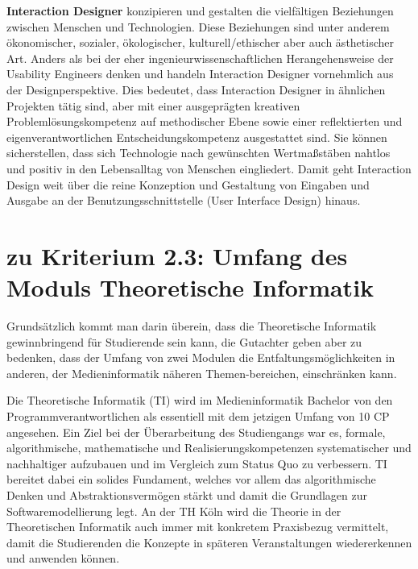 \textbf{Interaction Designer} konzipieren und gestalten die vielfältigen
Beziehungen zwischen Menschen und Technologien. Diese Beziehungen sind
unter anderem ökonomischer, sozialer, ökologischer, kulturell/ethischer
aber auch ästhetischer Art. Anders als bei der eher
ingenieurwissenschaftlichen Herangehensweise der Usability Engineers
denken und handeln Interaction Designer vornehmlich aus der
Designperspektive. Dies bedeutet, dass Interaction Designer in ähnlichen
Projekten tätig sind, aber mit einer ausgeprägten kreativen
Problemlösungskompetenz auf methodischer Ebene sowie einer reflektierten
und eigenverantwortlichen Entscheidungskompetenz ausgestattet sind. Sie
können sicherstellen, dass sich Technologie nach gewünschten
Wertmaßstäben nahtlos und positiv in den Lebensalltag von Menschen
eingliedert. Damit geht Interaction Design weit über die reine
Konzeption und Gestaltung von Eingaben und Ausgabe an der
Benutzungsschnittstelle (User Interface Design) hinaus.

\section{zu Kriterium 2.3: Umfang des Moduls Theoretische
Informatik}\label{zu-kriterium-2.3-umfang-des-moduls-theoretische-informatik}

\begin{siderules}
Grundsätzlich kommt man darin überein, dass die Theoretische Informatik
gewinnbringend für Studierende sein kann, die Gutachter geben aber zu
bedenken, dass der Umfang von zwei Modulen die Entfaltungsmöglichkeiten
in anderen, der Medieninformatik näheren Themen-bereichen, einschränken
kann.
\end{siderules}

Die Theoretische Informatik (TI) wird im Medieninformatik Bachelor von
den Programmverantwortlichen als essentiell mit dem jetzigen Umfang von
10 CP angesehen. Ein Ziel bei der Überarbeitung des Studiengangs war es,
formale, algorithmische, mathematische und Realisierungskompetenzen
systematischer und nachhaltiger aufzubauen und im Vergleich zum Status
Quo zu verbessern. TI bereitet dabei ein solides Fundament, welches vor
allem das algorithmische Denken und Abstraktionsvermögen stärkt und
damit die Grundlagen zur Softwaremodellierung legt. An der TH Köln wird
die Theorie in der Theoretischen Informatik auch immer mit konkretem
Praxisbezug vermittelt, damit die Studierenden die Konzepte in späteren
Veranstaltungen wiedererkennen und anwenden können.

